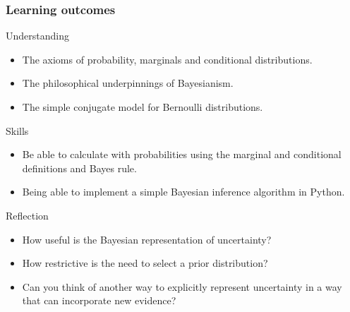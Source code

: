 \begin{frame}
  \frametitle{Learning outcomes}
  \begin{block}{Understanding}
    \begin{itemize}
    \item The axioms of probability, marginals and conditional distributions.
    \item The philosophical underpinnings of Bayesianism.
    \item The simple conjugate model for Bernoulli distributions.
    \end{itemize}
  \end{block}
  
  \begin{block}{Skills}
    \begin{itemize}
    \item Be able to calculate with probabilities using the marginal and conditional definitions and Bayes rule.
    \item Being able to implement a simple Bayesian inference algorithm in Python.
    \end{itemize}
  \end{block}

  \begin{block}{Reflection}
    \begin{itemize}
    \item How useful is the Bayesian representation of uncertainty?
    \item How restrictive is the need to select a prior distribution?
    \item Can you think of another way to explicitly represent uncertainty in a way that can incorporate new evidence?
    \end{itemize}
  \end{block}
  
\end{frame}


